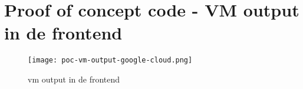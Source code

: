 \section{Proof of concept code - VM output in de frontend}\label{appendix:poc-vm-output-google-cloud}
\begin{figure}[hbt!]
  \centering
  \texttt{[image: poc-vm-output-google-cloud.png]}
  \caption{\Acrfull{vm} output in de frontend}
  \label{fig:poc-vm-output-google-cloud}
\end{figure}

\newpage